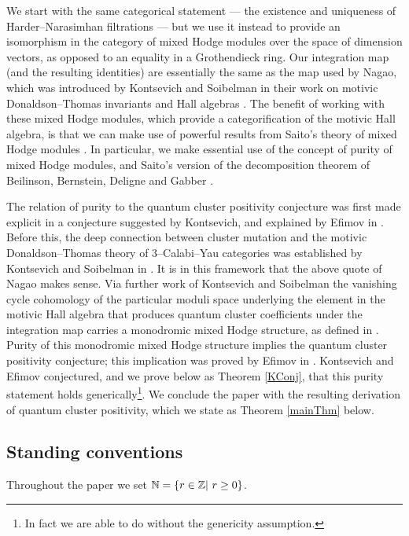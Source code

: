 \documentclass[a4paper,10pt]{amsart}
\begin{document}
We start with the same categorical statement  --- the existence and uniqueness of Harder--Narasimhan filtrations --- but we use it instead to provide an isomorphism in the category of mixed Hodge modules over the space of dimension vectors, as opposed to an equality in a Grothendieck ring.  Our integration map (and the resulting identities) are essentially the same as the map used by Nagao, which was introduced by Kontsevich and Soibelman in their work on motivic Donaldson--Thomas invariants and Hall algebras \cite{KS}.  The benefit of working with these mixed Hodge modules, which provide a categorification of the motivic Hall algebra, is that we can make use of powerful results from Saito's theory of mixed Hodge modules \cite{Sai89,Sai90,Saito89}.  In particular, we make essential use of the concept of purity of mixed Hodge modules, and Saito's version of the decomposition theorem of Beilinson, Bernstein, Deligne and Gabber \cite{BBD}.

The relation of purity to the quantum cluster positivity conjecture was first made explicit in a conjecture suggested by Kontsevich, and explained by Efimov in \cite{Efi11}.  Before this, the deep connection between cluster mutation and the motivic Donaldson--Thomas theory of 3--Calabi--Yau categories was established by Kontsevich and Soibelman in \cite{KS}.  It is in this framework that the above quote of Nagao makes sense.  Via further work of Kontsevich and Soibelman \cite{COHA} the vanishing cycle cohomology of the particular moduli space underlying the element in the motivic Hall algebra that produces quantum cluster coefficients under the integration map carries a monodromic mixed Hodge structure, as defined in \cite[Sec 7]{COHA}.  Purity of this monodromic mixed Hodge structure implies the quantum cluster positivity conjecture; this implication was proved by Efimov in \cite{Efi11}.  Kontsevich and Efimov conjectured, and we prove below as Theorem \ref{KConj}, that this purity statement holds generically\footnote{In fact we are able to do without the genericity assumption.}.  We conclude the paper with the resulting derivation of quantum cluster positivity, which we state as Theorem \ref{mainThm} below.





\subsection{Standing conventions}
Throughout the paper we set $\mathbb{N}=\{r\in\mathbb{Z}|\hbox{ }r\geq 0\}$.
\end{document}
